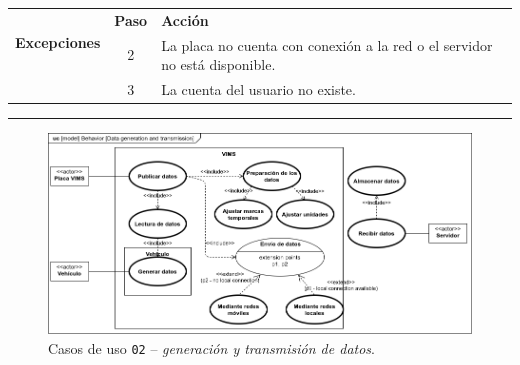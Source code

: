 \begin{table}[H]
\begin{tabularx}{\textwidth}{|c|c|X|}
    \hline
    \multirow{2}{*}{\textbf{Excepciones}}      & \textbf{Paso}                                                                                                          & \textbf{Acción}                                                                                                                    \\
    \cline{2-3}
                                               & 2                                                                                                                      & \multicolumn{1}{L|}{La placa no cuenta con conexión a la red o el servidor no está disponible.}                                    \\
    \cline{2-3}
                                               & 3                                                                                                                      & \multicolumn{1}{L|}{La cuenta del usuario no existe.}                                                                              \\
    \hline
  \end{tabularx}
\end{table}

\noindent\rule{\linewidth}{.2pt}

\begin{figure}[H]
  \centering
  \includegraphics[width=\linewidth]{diagrams/UseCases-UC2 - data.png}
  \caption{Casos de uso \texttt{02} -- \textit{generación y transmisión de datos}.}
  \label{uc:data}
\end{figure}

